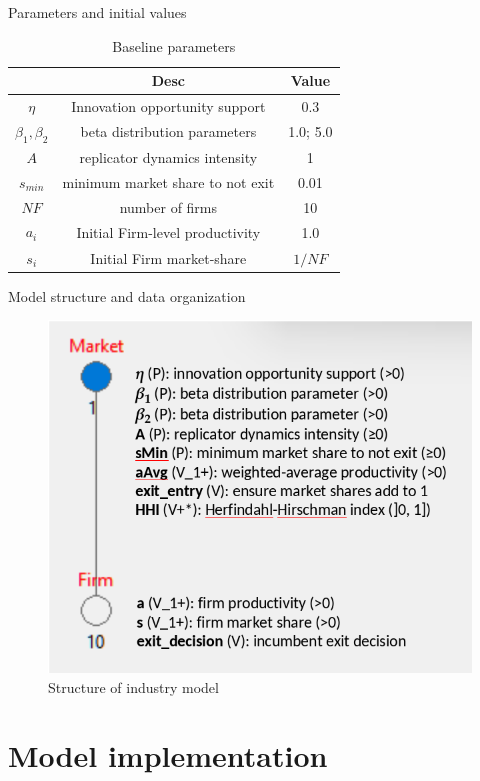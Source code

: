 \documentclass[bigger,aspectratio=169]{beamer}
\begin{document}
\begin{frame}[label={sec:org482a9d5}]{Parameters and initial values}
\begin{table}[htbp]
\caption{Baseline parameters}
\centering
\begin{tabular}{ccc}
\hline
 & Desc & Value\\
\hline
\(\eta\) & Innovation opportunity support & 0.3\\
\(\beta_{1}, \beta_{2}\) & beta distribution parameters & 1.0; 5.0\\
\(A\) & replicator dynamics intensity & 1\\
\(s_{min}\) & minimum market share to not exit & 0.01\\
\(NF\) & number of firms & 10\\
\hline
\(a_{i}_{}\) & Initial Firm-level productivity & 1.0\\
\(s_{i}\) & Initial Firm market-share & \(1/NF\)\\
\hline
\end{tabular}
\end{table}
\end{frame}
\begin{frame}[label={sec:org1edab29}]{Model structure and data organization}
\begin{figure}[htbp]
\centering
\includegraphics[clip,trim=0 0 0 0,width=.8\textwidth,height=.75\textheight]{figs/Structure_Industry_LSD.png}
\caption{Structure of industry model}
\end{figure}
\end{frame}
\section{Model implementation}
\label{sec:org7f47abc}
\end{document}

